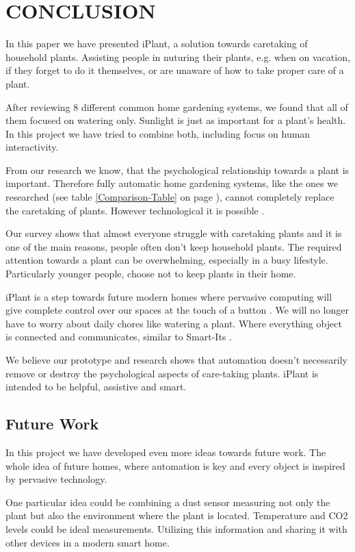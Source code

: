 \documentclass{ubicomp2012}
\begin{document}
\section{CONCLUSION}
In this paper we have presented iPlant, a solution towards caretaking of household plants. Assisting people in nuturing their plants, e.g. when on vacation, if they forget to do it themselves, or are unaware of how to take proper care of a plant. 

After reviewing 8 different common home gardening systems, we found that all of them focused on watering only. Sunlight is just as important for a plant's health. In this project we have tried to combine both, including focus on human interactivity.

From our research we know, that the psychological relationship towards a plant is important. Therefore fully automatic home gardening systems, like the ones we researched (see table \ref{Comparison-Table} on page \pageref{Comparison-Table}), cannot completely replace the caretaking of plants. However technological it is possible \cite{how-to-make-a-gardening-system}.

Our survey shows that almost everyone struggle with caretaking plants and it is one of the main reasons, people often don't keep household plants. The required attention towards a plant can be overwhelming, especially in a busy lifestyle. Particularly younger people, choose not to keep plants in their home.

iPlant is a step towards future modern homes where pervasive computing will give complete control over our spaces at the touch of a button \cite{future-homes}. We will no longer have to worry about daily chores like watering a plant. Where everything object is connected and communicates, similar to Smart-Its \cite{pervasive-book}.

We believe our prototype and research shows that automation doesn't necessarily remove or destroy the psychological aspects of care-taking plants. iPlant is intended to be helpful, assistive and smart.

\subsection{Future Work}
In this project we have developed even more ideas towards future work. The whole idea of future homes, where automation is key and every object is inspired by pervasive technology.

One particular idea could be combining a dust sensor measuring not only the plant but also the environment where the plant is located. Temperature and CO2 levels could be ideal measurements. Utilizing this information and sharing it with other devices in a modern smart home.
\end{document}

